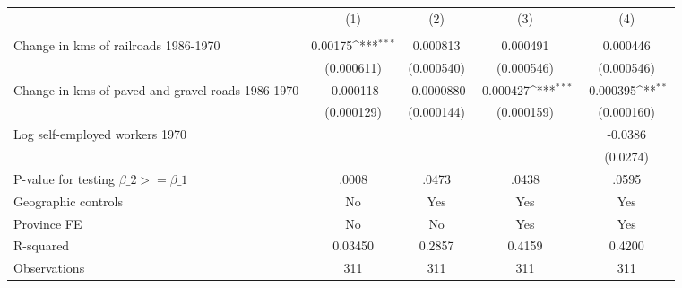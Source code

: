 {
\def\sym#1{\ifmmode^{#1}\else\(^{#1}\)\fi}
\begin{tabular}{l*{4}{c}}
\hline\hline
                &\multicolumn{1}{c}{(1)}&\multicolumn{1}{c}{(2)}&\multicolumn{1}{c}{(3)}&\multicolumn{1}{c}{(4)}\\
                &\multicolumn{1}{c}{}&\multicolumn{1}{c}{}&\multicolumn{1}{c}{}&\multicolumn{1}{c}{}\\
\hline
Change in kms of railroads 1986-1970&  0.00175\sym{***}& 0.000813         & 0.000491         & 0.000446         \\
                &(0.000611)         &(0.000540)         &(0.000546)         &(0.000546)         \\
[1em]
Change in kms of paved and gravel roads 1986-1970&-0.000118         &-0.0000880         &-0.000427\sym{***}&-0.000395\sym{**} \\
                &(0.000129)         &(0.000144)         &(0.000159)         &(0.000160)         \\
[1em]
Log self-employed workers 1970&                  &                  &                  &  -0.0386         \\
                &                  &                  &                  & (0.0274)         \\
\hline
P-value for testing $\beta\_{2} >= \beta\_{1}$&    .0008         &    .0473         &    .0438         &    .0595         \\
Geographic controls&       No         &      Yes         &      Yes         &      Yes         \\
Province FE     &       No         &       No         &      Yes         &      Yes         \\
R-squared       &  0.03450         &   0.2857         &   0.4159         &   0.4200         \\
Observations    &      311         &      311         &      311         &      311         \\
\hline\hline
\end{tabular}
}
